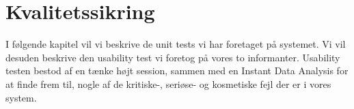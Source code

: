 \chapter{Kvalitetssikring}
\label{chap:kvalitetssikring}
I følgende kapitel vil vi beskrive de unit tests vi har foretaget på systemet. Vi vil desuden beskrive den usability test vi foretog på vores to informanter. Usability testen bestod af en tænke højt session, sammen med en Instant Data Analysis for at finde frem til, nogle af de kritiske-, seriøse- og kosmetiske fejl der er i vores system.



